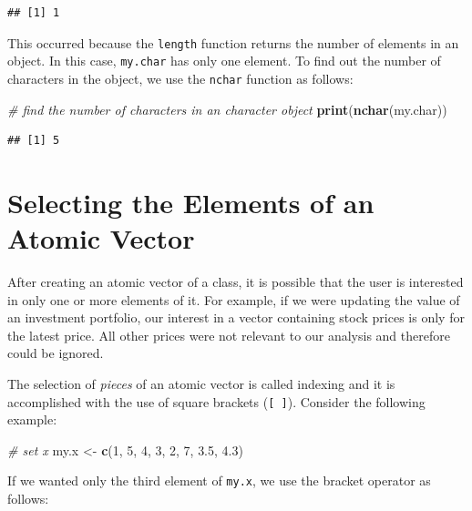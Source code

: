 \documentclass[11pt,]{book}
\newenvironment{Shaded}{\begin{snugshade}}{\end{snugshade}}
\newcommand{\KeywordTok}[1]{\textcolor[rgb]{0.27,0.27,0.27}{\textbf{#1}}}
\newcommand{\DecValTok}[1]{\textcolor[rgb]{0.06,0.06,0.06}{#1}}
\newcommand{\FloatTok}[1]{\textcolor[rgb]{0.06,0.06,0.06}{#1}}
\newcommand{\StringTok}[1]{\textcolor[rgb]{0.5,0.5,0.5}{#1}}
\newcommand{\CommentTok}[1]{\textcolor[rgb]{0.56,0.35,0.01}{\textit{#1}}}
\newcommand{\NormalTok}[1]{#1}
\begin{document}
\begin{verbatim}
## [1] 1
\end{verbatim}

This occurred because the \texttt{length} function returns the number of
elements in an object. In this case, \texttt{my.char} has only one
element. To find out the number of characters in the object, we use the
\texttt{nchar} function as follows: 

\begin{Shaded}
\begin{Highlighting}[]
\CommentTok{# find the number of characters in an character object}
\KeywordTok{print}\NormalTok{(}\KeywordTok{nchar}\NormalTok{(my.char))}
\end{Highlighting}
\end{Shaded}

\begin{verbatim}
## [1] 5
\end{verbatim}

\section{Selecting the Elements of an Atomic
Vector}\label{selecting-the-elements-of-an-atomic-vector}

After creating an atomic vector of a class, it is possible that the user
is interested in only one or more elements of it. For example, if we
were updating the value of an investment portfolio, our interest in a
vector containing stock prices is only for the latest price. All other
prices were not relevant to our analysis and therefore could be ignored.

The selection of \emph{pieces} of an atomic vector is called indexing
and it is accomplished with the use of square brackets
(\texttt{{[}\ {]}}). Consider the following example:

\begin{Shaded}
\begin{Highlighting}[]
\CommentTok{# set x}
\NormalTok{my.x <-}\StringTok{ }\KeywordTok{c}\NormalTok{(}\DecValTok{1}\NormalTok{, }\DecValTok{5}\NormalTok{, }\DecValTok{4}\NormalTok{, }\DecValTok{3}\NormalTok{, }\DecValTok{2}\NormalTok{, }\DecValTok{7}\NormalTok{, }\FloatTok{3.5}\NormalTok{, }\FloatTok{4.3}\NormalTok{)}
\end{Highlighting}
\end{Shaded}

If we wanted only the third element of \texttt{my.x}, we use the bracket
operator as follows:
\end{document}
